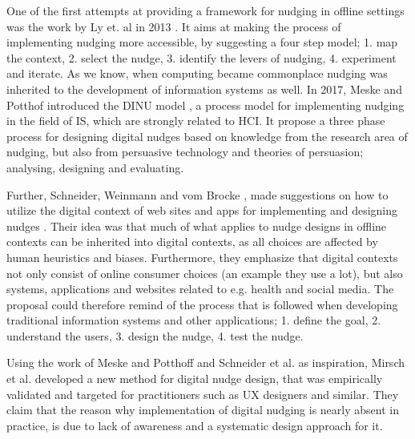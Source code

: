One of the first attempts at providing a framework for nudging in offline settings was the work by Ly et. al 
in 2013 \cite{ly_practitioners_2013}. It aims at making the process of implementing nudging more accessible, by suggesting a four step model; 1. map the context, 2. select the nudge, 3. identify the levers of nudging, 4. experiment and iterate. As we know, when computing became commonplace nudging was inherited to the development of information systems as well. In 2017, Meske and Potthof introduced the DINU model \cite{meske_dinu-model_2017},
a process model for implementing nudging in the field of IS, which are strongly related to HCI. It propose a three phase process for designing digital nudges based on knowledge from the research area of nudging, but also from persuasive technology and theories of persuasion; analysing, designing and evaluating. 

Further, Schneider, Weinmann and vom Brocke \cite{schneider_digital_2018}, made suggestions on how to utilize the digital context of web sites and apps for implementing and designing nudges .
Their idea was that much of what applies to nudge designs in offline contexts can be inherited into digital contexts, as all choices are affected by human heuristics and biases. Furthermore, they emphasize that digital contexts not only consist of online consumer choices (an example they use a lot), but also systems, applications and websites related to e.g. health and social media. The proposal could therefore remind of the process that is followed when developing traditional information systems and other applications; 1. define  the  goal, 2. understand  the  users, 3. design  the  nudge,  4. test  the  nudge. 

Using the work of Meske and Potthoff 
\cite{meske_dinu-model_2017}
and Schneider et al. 
\cite{schneider_digital_2018}
as inspiration, Mirsch et al.\cite{mirsch_making_2018} developed a new method for digital nudge design, that was empirically validated and targeted for practitioners such as UX designers and similar.
They claim that the reason why implementation of digital nudging is nearly absent in practice, is due to lack of awareness and a systematic design approach for it.

